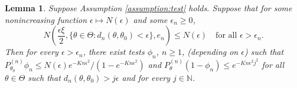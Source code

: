 \documentclass[11pt]{article}
\theoremstyle{plain}
\newtheorem{lemma}{\quad\quad Lemma}
\theoremstyle{definition}
\theoremstyle{remark}
\begin{document}
\begin{lemma}
    Suppose Assumption \ref{assumption:test} holds. 
    Suppose that for some nonincreasing function $\epsilon \mapsto N(\epsilon)$ and some $\epsilon_n \geq 0$,
    \begin{equation*}
        N\left( \frac{\epsilon \xi}{2}, \{\theta\in \Theta: d_n (\theta, \theta_0)< \epsilon\}, e_n \right) \leq N(\epsilon)\quad
        \textrm{for all }\epsilon> \epsilon_n.
    \end{equation*}
    Then for every $\epsilon > \epsilon_n$, there exist tests $\phi_n$, $n\geq 1$, (depending on $\epsilon$) such that \mbox{$P_{\theta_0}^{(n)} \phi_n \leq N(\epsilon) e^{-Kn\epsilon^2}/(1-e^{-Kn\epsilon^2})$} and $P_{\theta}^{(n)} (1-\phi_n) \leq e^{-K n \epsilon^2 j^2}$ for all $\theta \in \Theta$ such that $d_n(\theta,\theta_0) > j \epsilon$ and for every $j \in \mathbb N$.
    \label{lemma:test}
\end{lemma}
\end{document}
